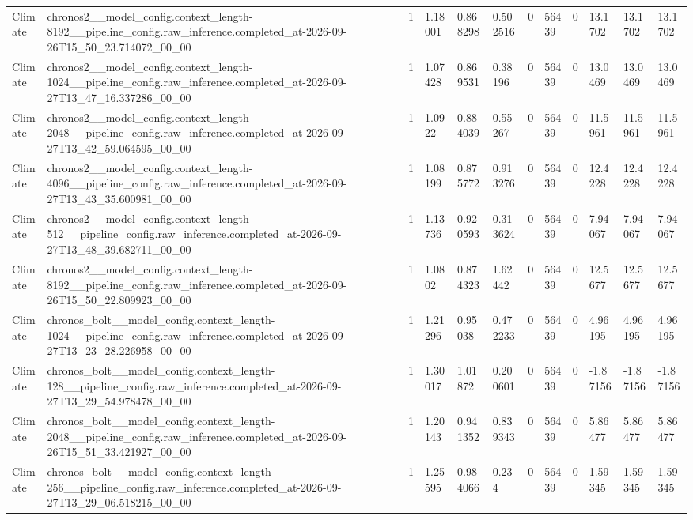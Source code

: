 \begin{tabular}{llllllllllll}
Climate & chronos2\_\_model\_config.context\_length-8192\_\_pipeline\_config.raw\_inference.completed\_at-2026-09-26T15\_50\_23.714072\_00\_00 & 1 & 1.18001 & 0.868298 & 0.502516 & 0 & 56439 & 0 & 13.1702 & 13.1702 & 13.1702 \\
Climate & chronos2\_\_model\_config.context\_length-1024\_\_pipeline\_config.raw\_inference.completed\_at-2026-09-27T13\_47\_16.337286\_00\_00 & 1 & 1.07428 & 0.869531 & 0.38196 & 0 & 56439 & 0 & 13.0469 & 13.0469 & 13.0469 \\
Climate & chronos2\_\_model\_config.context\_length-2048\_\_pipeline\_config.raw\_inference.completed\_at-2026-09-27T13\_42\_59.064595\_00\_00 & 1 & 1.0922 & 0.884039 & 0.55267 & 0 & 56439 & 0 & 11.5961 & 11.5961 & 11.5961 \\
Climate & chronos2\_\_model\_config.context\_length-4096\_\_pipeline\_config.raw\_inference.completed\_at-2026-09-27T13\_43\_35.600981\_00\_00 & 1 & 1.08199 & 0.875772 & 0.913276 & 0 & 56439 & 0 & 12.4228 & 12.4228 & 12.4228 \\
Climate & chronos2\_\_model\_config.context\_length-512\_\_pipeline\_config.raw\_inference.completed\_at-2026-09-27T13\_48\_39.682711\_00\_00 & 1 & 1.13736 & 0.920593 & 0.313624 & 0 & 56439 & 0 & 7.94067 & 7.94067 & 7.94067 \\
Climate & chronos2\_\_model\_config.context\_length-8192\_\_pipeline\_config.raw\_inference.completed\_at-2026-09-26T15\_50\_22.809923\_00\_00 & 1 & 1.0802 & 0.874323 & 1.62442 & 0 & 56439 & 0 & 12.5677 & 12.5677 & 12.5677 \\
Climate & chronos\_bolt\_\_model\_config.context\_length-1024\_\_pipeline\_config.raw\_inference.completed\_at-2026-09-27T13\_23\_28.226958\_00\_00 & 1 & 1.21296 & 0.95038 & 0.472233 & 0 & 56439 & 0 & 4.96195 & 4.96195 & 4.96195 \\
Climate & chronos\_bolt\_\_model\_config.context\_length-128\_\_pipeline\_config.raw\_inference.completed\_at-2026-09-27T13\_29\_54.978478\_00\_00 & 1 & 1.30017 & 1.01872 & 0.200601 & 0 & 56439 & 0 & -1.87156 & -1.87156 & -1.87156 \\
Climate & chronos\_bolt\_\_model\_config.context\_length-2048\_\_pipeline\_config.raw\_inference.completed\_at-2026-09-26T15\_51\_33.421927\_00\_00 & 1 & 1.20143 & 0.941352 & 0.839343 & 0 & 56439 & 0 & 5.86477 & 5.86477 & 5.86477 \\
Climate & chronos\_bolt\_\_model\_config.context\_length-256\_\_pipeline\_config.raw\_inference.completed\_at-2026-09-27T13\_29\_06.518215\_00\_00 & 1 & 1.25595 & 0.984066 & 0.234 & 0 & 56439 & 0 & 1.59345 & 1.59345 & 1.59345 \\

\end{tabular}
